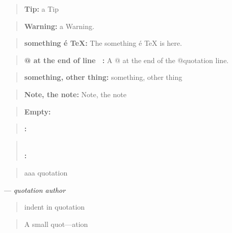 \documentclass{book}
\begin{document}
\begin{titlepage}
\begin{quote}
\textbf{Tip:} a Tip
\end{quote}

\begin{quote}
\textbf{Warning:} a Warning.
\end{quote}

\begin{quote}
\textbf{something \'{e} \TeX{}:} The something \'{e} \TeX{} is here.
\end{quote}

\begin{quote}
\textbf{@ at the end of line \ {}:} A @ at the end of the @quotation line.
\end{quote}

\begin{quote}
\textbf{something, other thing:} something, other thing
\end{quote}

\begin{quote}
\textbf{Note, the note:} Note, the note
\end{quote}

\begin{quote}
\end{quote}

\begin{quote}
\textbf{Empty:} \end{quote}

\begin{quote}
\textbf{:} \end{quote}

\begin{quote}
\textbf{\leavevmode{}\\:} \end{quote}

\begin{quote}
aaa quotation
\end{quote}
\begin{center}
--- \emph{quotation author}
\end{center}

\begin{quote}
indent in quotation
\end{quote}

\begin{quote}
\begin{footnotesize}
A small quot---ation
\end{footnotesize}
\end{quote}


\end{titlepage}
\end{document}
